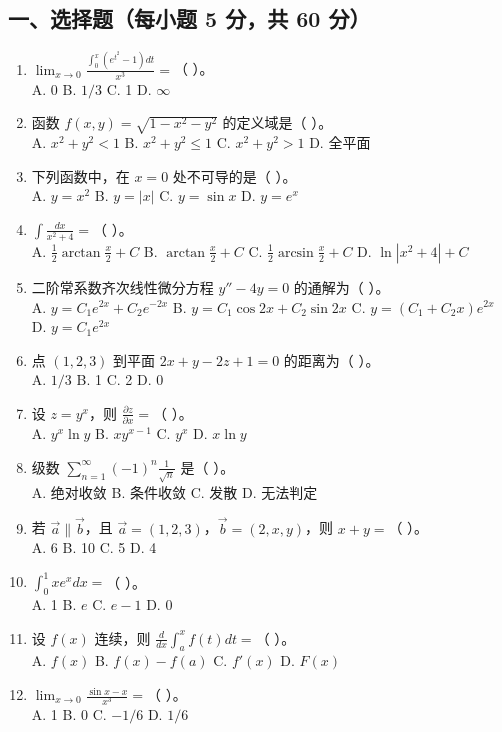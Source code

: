\documentclass[11pt,a4paper]{article}
\begin{document}
\subsection*{一、选择题（每小题 5 分，共 60 分）}
\begin{enumerate}
    \item $\lim_{x \to 0} \frac{\int_0^x (e^{t^2}-1) dt}{x^3} = $（ ）。 \\
    A. 0 \quad B. $1/3$ \quad C. 1 \quad D. $\infty$
    \item 函数 $f(x,y) = \sqrt{1-x^2-y^2}$ 的定义域是（ ）。 \\
    A. $x^2+y^2 < 1$ \quad B. $x^2+y^2 \le 1$ \quad C. $x^2+y^2 > 1$ \quad D. 全平面
    \item 下列函数中，在 $x=0$ 处不可导的是（ ）。 \\
    A. $y = x^2$ \quad B. $y = |x|$ \quad C. $y = \sin x$ \quad D. $y = e^x$
    \item $\int \frac{dx}{x^2+4} = $（ ）。 \\
    A. $\frac{1}{2}\arctan\frac{x}{2} + C$ \quad B. $\arctan\frac{x}{2} + C$ \quad C. $\frac{1}{2}\arcsin\frac{x}{2} + C$ \quad D. $\ln|x^2+4| + C$
    \item 二阶常系数齐次线性微分方程 $y'' - 4y = 0$ 的通解为（ ）。 \\
    A. $y = C_1 e^{2x} + C_2 e^{-2x}$ \quad B. $y = C_1 \cos 2x + C_2 \sin 2x$ \quad C. $y = (C_1+C_2 x)e^{2x}$ \quad D. $y = C_1 e^{2x}$
    \item 点 $(1, 2, 3)$ 到平面 $2x+y-2z+1=0$ 的距离为（ ）。 \\
    A. $1/3$ \quad B. 1 \quad C. 2 \quad D. 0
    \item 设 $z = y^x$，则 $\frac{\partial z}{\partial x} = $（ ）。 \\
    A. $y^x \ln y$ \quad B. $x y^{x-1}$ \quad C. $y^x$ \quad D. $x \ln y$
    \item 级数 $\sum_{n=1}^{\infty} (-1)^n \frac{1}{\sqrt{n}}$ 是（ ）。 \\
    A. 绝对收敛 \quad B. 条件收敛 \quad C. 发散 \quad D. 无法判定
    \item 若 $\vec{a} \parallel \vec{b}$，且 $\vec{a}=(1,2,3)$，$\vec{b}=(2,x,y)$，则 $x+y = $（ ）。 \\
    A. 6 \quad B. 10 \quad C. 5 \quad D. 4
    \item $\int_0^1 x e^x dx = $（ ）。 \\
    A. 1 \quad B. $e$ \quad C. $e-1$ \quad D. 0
    \item 设 $f(x)$ 连续，则 $\frac{d}{dx} \int_a^x f(t) dt = $（ ）。 \\
    A. $f(x)$ \quad B. $f(x)-f(a)$ \quad C. $f'(x)$ \quad D. $F(x)$
    \item $\lim_{x \to 0} \frac{\sin x - x}{x^3} = $（ ）。 \\
    A. 1 \quad B. 0 \quad C. $-1/6$ \quad D. $1/6$
\end{enumerate}
\end{document}
